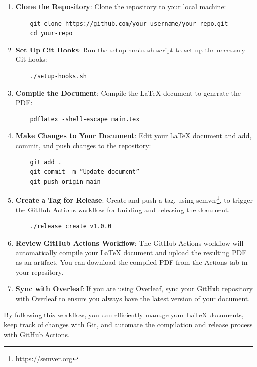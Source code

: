 \documentclass[a4paper]{article}
\begin{document}
\begin{enumerate}
    \item \textbf{Clone the Repository}:
    Clone the repository to your local machine:
    \begin{verbatim}
    git clone https://github.com/your-username/your-repo.git
    cd your-repo
    \end{verbatim}
    \item \textbf{Set Up Git Hooks}:
    Run the setup-hooks.sh script to set up the necessary Git hooks:
    \begin{verbatim}
    ./setup-hooks.sh
    \end{verbatim}
    \item  \textbf{Compile the Document}:
    Compile the LaTeX document to generate the PDF:
    \begin{verbatim}
    pdflatex -shell-escape main.tex
    \end{verbatim}
    \item \textbf{Make Changes to Your Document}:
    Edit your LaTeX document and add, commit, and push changes to the repository:
    \begin{verbatim}
    git add .
    git commit -m “Update document”
    git push origin main
    \end{verbatim}
    \item \textbf{Create a Tag for Release}:
    Create and push a tag, using semver\footnote{\url{https://semver.org}},  to trigger the GitHub Actions workflow for building and releasing the document:
    \begin{verbatim}
    ./release create v1.0.0
    \end{verbatim}
    \item \textbf{Review GitHub Actions Workflow}:
    The GitHub Actions workflow will automatically compile your LaTeX document and upload the resulting PDF as an artifact. 
    You can download the compiled PDF from the Actions tab in your repository.
    \item \textbf{Sync with Overleaf}:
    If you are using Overleaf, sync your GitHub repository with Overleaf to ensure you always have the latest version of your document.
\end{enumerate}

By following this workflow, you can efficiently manage your LaTeX documents, keep track of changes with Git, and automate the compilation and release process with GitHub Actions.
\end{document}
